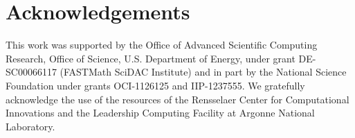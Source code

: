 \documentclass[final,1p,times]{elsarticle}
\begin{document}
\section*{Acknowledgements}

This work was supported by the Office of Advanced Scientific Computing Research,
Office of Science, U.S. Department of Energy, under grant DE-SC00066117
(FASTMath SciDAC Institute) and in part by the National Science Foundation under
grants OCI-1126125 and IIP-1237555. We gratefully acknowledge the use of the
resources of the Rensselaer Center for Computational Innovations and the
Leadership Computing Facility at Argonne National Laboratory.








\end{document}
